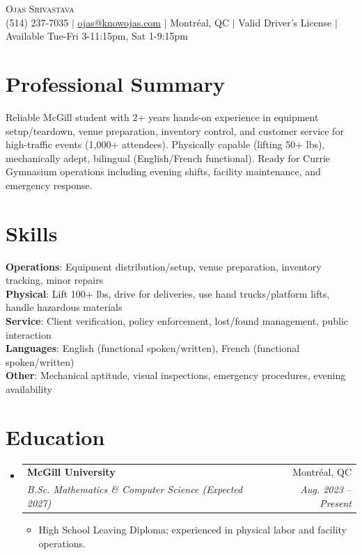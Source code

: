 \documentclass[letterpaper,10pt]{article}
\makeatletter
\newcommand{\resumeItem}[1]{\item\small{{#1 \vspace{-2pt}}}}
\newcommand{\resumeSubheading}[4]{
  \vspace{-4pt}\item
  \begin{tabular*}{0.97\textwidth}[t]{l@{\extracolsep{\fill}}r}
    \textbf{#1} & #2 \\
    \textit{#3} & \textit{ #4} \\
  \end{tabular*}\vspace{-5pt}
}
\newcommand{\resumeItemListStart}{\begin{itemize}}
\newcommand{\resumeItemListEnd}{\end{itemize}\vspace{-5pt}}
\newcommand{\resumeSubHeadingListStart}{\begin{itemize}[leftmargin=0.15in, label={}]}
\newcommand{\resumeSubHeadingListEnd}{\end{itemize}}
\makeatother
\begin{document}
\begin{center}
    {\Huge \scshape Ojas Srivastava} \\ \vspace{1pt}
    \small (514) 237-7035 $|$ \href{mailto:ojas@knowojas.com}{ojas@knowojas.com} $|$ 
    Montréal, QC $|$ Valid Driver's License $|$ Available Tue-Fri 3-11:15pm, Sat 1-9:15pm
\end{center}

\section{Professional Summary}
Reliable McGill student with 2+ years hands-on experience in equipment setup/teardown, venue preparation, inventory control, and customer service for high-traffic events (1,000+ attendees). Physically capable (lifting 50+ lbs), mechanically adept, bilingual (English/French functional). Ready for Currie Gymnasium operations including evening shifts, facility maintenance, and emergency response.

\section{Skills}
\begin{itemize}[leftmargin=0.15in, label={}]
    \small{\item{
     \textbf{Operations}: Equipment distribution/setup, venue preparation, inventory tracking, minor repairs \\
     \textbf{Physical}: Lift 100+ lbs, drive for deliveries, use hand trucks/platform lifts, handle hazardous materials \\
     \textbf{Service}: Client verification, policy enforcement, lost/found management, public interaction \\
     \textbf{Languages}: English (functional spoken/written), French (functional spoken/written) \\
     \textbf{Other}: Mechanical aptitude, visual inspections, emergency procedures, evening availability
    }}
\end{itemize}

\section{Education}
\resumeSubHeadingListStart
\resumeSubheading
  {McGill University}{Montréal, QC}
  {B.Sc. Mathematics \& Computer Science (Expected 2027)}{Aug. 2023 -- Present}
\resumeItemListStart
  \resumeItem{High School Leaving Diploma; experienced in physical labor and facility operations.}
\resumeItemListEnd
\resumeSubHeadingListEnd
\end{document}

